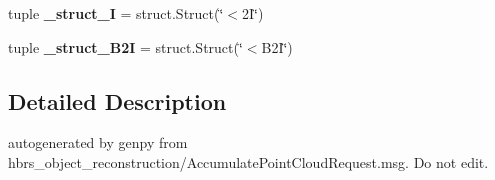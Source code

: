 \begin{DoxyCompactItemize}
\item 
\hypertarget{namespacehbrs__object__reconstruction_1_1srv_1_1___accumulate_point_cloud_a080480fb04b01a1f57a3f8147379274c}{tuple {\bfseries \-\_\-struct\-\_\-I} = struct.\-Struct(\char`\"{}$<$2\-I\char`\"{})}\label{namespacehbrs__object__reconstruction_1_1srv_1_1___accumulate_point_cloud_a080480fb04b01a1f57a3f8147379274c}

\item 
\hypertarget{namespacehbrs__object__reconstruction_1_1srv_1_1___accumulate_point_cloud_a838e5975b2b8632b8fd46b90764116ec}{tuple {\bfseries \-\_\-struct\-\_\-\-B2\-I} = struct.\-Struct(\char`\"{}$<$\-B2\-I\char`\"{})}\label{namespacehbrs__object__reconstruction_1_1srv_1_1___accumulate_point_cloud_a838e5975b2b8632b8fd46b90764116ec}

\end{DoxyCompactItemize}


\subsection{\-Detailed \-Description}
\begin{DoxyVerb}autogenerated by genpy from hbrs_object_reconstruction/AccumulatePointCloudRequest.msg. Do not edit.\end{DoxyVerb}
 